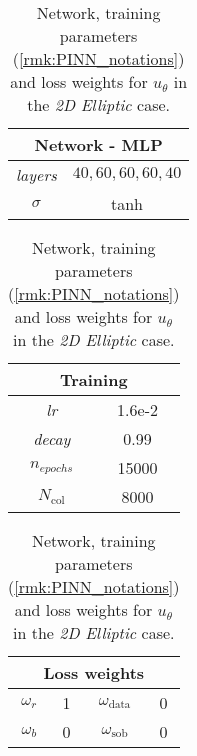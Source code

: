 \begin{table}[htbp]
    \centering
    \begin{tabular}{cc}
        \toprule
        \multicolumn{2}{c}{\textbf{Network - MLP}} \\
        \midrule
        \textit{layers} & $40, 60, 60, 60, 40$ \\
        \cmidrule(lr){1-2}
        $\sigma$ & tanh \\
        \bottomrule
    \end{tabular}
    \hspace{1cm}
    \begin{tabular}{cc}
        \toprule
        \multicolumn{2}{c}{\textbf{Training}} \\
        \midrule
        \textit{lr} & 1.6e-2 \\
        \cmidrule(lr){1-2}
        \textit{decay} & 0.99 \\
        \cmidrule(lr){1-2}
        $n_{epochs}$ & 15000 \\
        \cmidrule(lr){1-2}
        $N_\text{col}$ & 8000 \\
        \bottomrule
    \end{tabular}
    \hspace{1cm}
    \begin{tabular}{cccc}
        \toprule
        \multicolumn{4}{c}{\textbf{Loss weights}} \\
        \midrule
        $\omega_r$ & 1 & $\omega_\text{data}$ & 0 \\
        \cmidrule(lr){1-2} \cmidrule(lr){3-4}
        $\omega_b$ & 0 & $\omega_\text{sob}$ & 0 \\        
        \bottomrule
    \end{tabular}
    \caption{Network, training parameters (\cref{rmk:PINN_notations}) and loss weights for $u_\theta$ in the \textit{2D Elliptic} case.}
    \label{tab:paramtest3_2D}
\end{table}